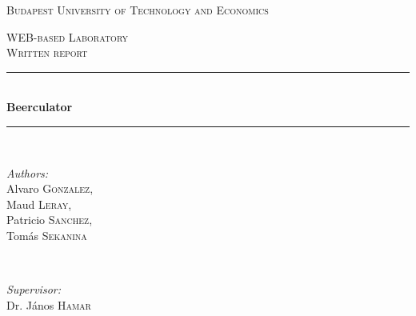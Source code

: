 \documentclass[a4paper]{article}
\begin{document}
\begin{titlepage}

\newcommand{\HRule}{\rule{\linewidth}{0.5mm}}

\center

\begin{spacing}{1.5}
\textsc{\LARGE Budapest University of Technology and Economics}\\[2cm]
\end{spacing}
\textsc{\Large WEB-based Laboratory}\\[0.5cm]
\textsc{\large Written report}\\[0.5cm]

\HRule \\[0.4cm]
{ \huge \bfseries Beerculator}\\[0.4cm] %
\HRule \\[1.5cm]
 
\begin{minipage}{0.4\textwidth}
\begin{flushleft} \large
\emph{Authors:}\\
Alvaro \textsc{Gonzalez},\\
Maud \textsc{Leray},\\
Patricio \textsc{Sanchez},\\
Tomás \textsc{Sekanina}
\end{flushleft}
\end{minipage}
~
\begin{minipage}{0.4\textwidth}
\begin{flushright} \large
\emph{Supervisor:} \\
Dr. János \textsc{Hamar}
\end{flushright}
\end{minipage}\\[4cm]

\end{titlepage}


    \tableofcontents

    \newpage
    
    \newpage
    
    \newpage
    
    \newpage
    
    \newpage
    
    \newpage
    
    \newpage
    
    \newpage
    
    \newpage
    
    \newpage
    
    \newpage
    
\end{document}
